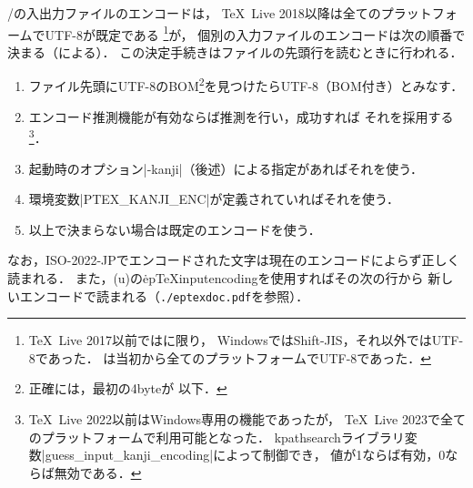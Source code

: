 \documentclass[a4paper,11pt,nomag,dvipdfmx]{jsarticle}
\begin{document}
\pTeX/\upTeX の入出力ファイルのエンコードは，
\TeX~Live 2018以降は全てのプラットフォームでUTF-8が既定である
\footnote{\TeX~Live 2017以前では\pTeX に限り，
WindowsではShift-JIS，それ以外ではUTF-8であった．
\upTeX は当初から全てのプラットフォームでUTF-8であった．}が，
個別の入力ファイルのエンコードは次の順番で決まる（による）．
この決定手続きはファイルの先頭行を読むときに行われる．
\begin{enumerate}
 \item ファイル先頭にUTF-8のBOM\footnote{正確には，最初の4byteが
   以下．}を見つけたらUTF-8（BOM付き）とみなす．
 \item エンコード推測機能が有効ならば推測を行い，成功すれば
   それを採用する\footnote{\TeX~Live 2022以前はWindows専用の機能であったが，
   \TeX~Live 2023で全てのプラットフォームで利用可能となった\cite{tjb142}．
   kpathsearchライブラリ変数|guess_input_kanji_encoding|によって制御でき，
   値が1ならば有効，0ならば無効である．}．
 \item 起動時のオプション|-kanji|（後述）による指定があればそれを使う．
 \item 環境変数|PTEX_KANJI_ENC|が定義されていればそれを使う．
 \item 以上で決まらない場合は既定のエンコードを使う．
\end{enumerate}

なお，ISO-2022-JPでエンコードされた文字は現在のエンコードによらず正しく読まれる．
また，\eTeXpre(u)\pTeX の\.{epTeXinputencoding}を使用すればその次の行から
新しいエンコードで読まれる（\texttt{./eptexdoc.pdf}を参照）．
\end{document}
